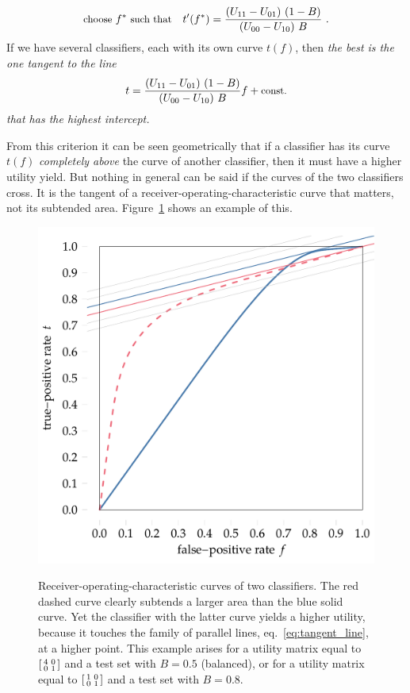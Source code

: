 \documentclass[\ifafour a4paper,12pt,\else a5paper,10pt,\fi%
onecolumn,oneside,article,%
british%
]{memoir}
\theoremstyle{remark}
\theoremstyle{innote}
\renewcommand*{\|}[1][]{\nonscript\:#1\vert\nonscript\:\mathopen{}}
\newcommand*{\eqn}{eq.}%
\begin{document}
\begin{equation}
  \label{eq:threshold_auc_maxutility_derivat}
  \text{\small choose } f^{*} \text{\small\ such that}\quad
t'(f^{*}) = \frac{(U_{11} - U_{01})\ (1-B)}{(U_{00} - U_{10})\  B} \ .
\end{equation}
If we have several classifiers, each with its own curve $t(f)$, then \emph{the best is the one tangent to the line
\begin{equation}
  \label{eq:tangent_line}
  t = \frac{(U_{11} - U_{01})\ (1-B)}{(U_{00} - U_{10})\  B} f + \text{\normalfont\small const.}
\end{equation}
that has the highest intercept.}

From this criterion it can be seen geometrically that if a classifier has its curve $t(f)$ \emph{completely above} the curve of another classifier, then it must have a higher utility yield. But nothing in general can be said if the curves of the two classifiers cross. It is the tangent of a receiver-operating-characteristic curve that matters, not its subtended area. Figure~\ref{fig:auc_example} shows an example of this.
\begin{figure}[t]
  \centering
    \includegraphics[width=0.66\linewidth]{auc_example.pdf}\\
    \caption{Receiver-operating-characteristic curves of two classifiers. The {\color{red}red dashed curve} clearly subtends a larger area than the {\color{blue}blue solid curve}. Yet the classifier with the latter curve yields a higher utility, because it touches the family of parallel lines, \eqn~\eqref{eq:tangent_line}, at a higher point. This example arises for a utility matrix equal to $\begin{bsmallmatrix} 4&0\\0&1 \end{bsmallmatrix}$ and a test set with $B=0.5$ (balanced), or for a utility matrix equal to $\begin{bsmallmatrix} 1&0\\0&1 \end{bsmallmatrix}$ and a test set with $B=0.8$.}
  \label{fig:auc_example}
\end{figure}
\end{document}
